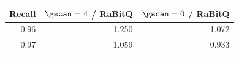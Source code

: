 \begin{tabular}{@{}rrr@{}}
\toprule
Recall & $\gscan=4$ / RaBitQ & $\gscan=0$ / RaBitQ \\
\midrule
0.96 & 1.250 & 1.072 \\
0.97 & 1.059 & 0.933 \\
\bottomrule
\end{tabular}
